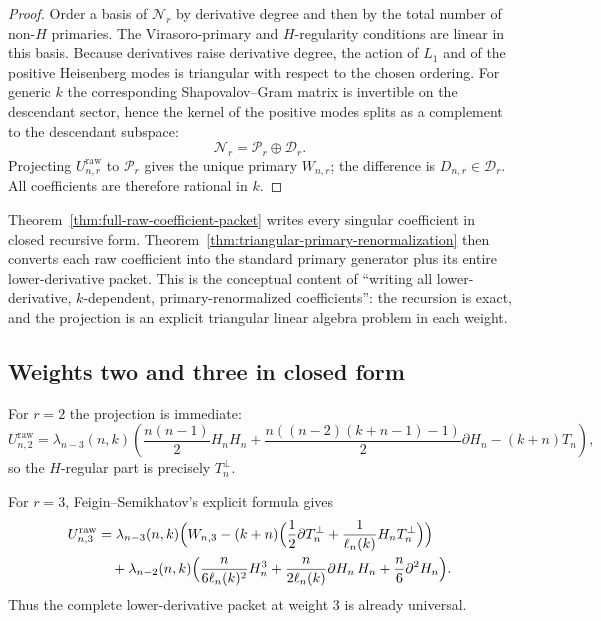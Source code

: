 \begin{proof}
Order a basis of $\mathcal N_r$ by derivative degree and then by the total
number of non-$H$ primaries.  The Virasoro-primary and $H$-regularity
conditions are linear in this basis.  Because derivatives raise derivative
degree, the action of $L_1$ and of the positive Heisenberg modes is triangular
with respect to the chosen ordering.  For generic $k$ the corresponding
Shapovalov--Gram matrix is invertible on the descendant sector, hence the kernel
of the positive modes splits as a complement to the descendant subspace:
\[
\mathcal N_r=\mathcal P_r\oplus\mathcal D_r.
\]
Projecting $U_{n,r}^{\mathrm{raw}}$ to $\mathcal P_r$ gives the unique primary
$W_{n,r}$; the difference is $D_{n,r}\in\mathcal D_r$.  All coefficients are
therefore rational in $k$.
\end{proof}

\begin{remark}
Theorem~\ref{thm:full-raw-coefficient-packet} writes every singular coefficient
in closed recursive form.  Theorem~\ref{thm:triangular-primary-renormalization}
then converts each raw coefficient into the standard primary generator plus its
entire lower-derivative packet.  This is the conceptual content of ``writing
all lower-derivative, $k$-dependent, primary-renormalized coefficients'':
the recursion is exact, and the projection is an explicit triangular linear
algebra problem in each weight.
\end{remark}

\subsection{Weights two and three in closed form}

For $r=2$ the projection is immediate:
\[
U_{n,2}^{\mathrm{raw}}
=
\lambda_{n-3}(n,k)
\left(
\frac{n(n-1)}{2}H_nH_n
+
\frac{n((n-2)(k+n-1)-1)}{2}\partial H_n
-
(k+n)T_n
\right),
\]
so the $H$-regular part is precisely $T_n^\perp$.

For $r=3$, Feigin--Semikhatov's explicit formula gives
\begin{align}
U_{n,3}^{\mathrm{raw}}
&=
\lambda_{n-3}(n,k)
\Bigl(
W_{n,3}
-(k+n)\Bigl(\frac12\partial T_n^\perp+\frac{1}{\ell_n(k)}H_nT_n^\perp\Bigr)
\Bigr)
\notag\\
&\quad
+
\lambda_{n-2}(n,k)
\Bigl(
\frac{n}{6\ell_n(k)^2}H_n^3
+
\frac{n}{2\ell_n(k)}\partial H_n\,H_n
+
\frac{n}{6}\partial^2H_n
\Bigr).
\label{eq:weight-three-renormalized}
\end{align}
Thus the complete lower-derivative packet at weight $3$ is already universal.

